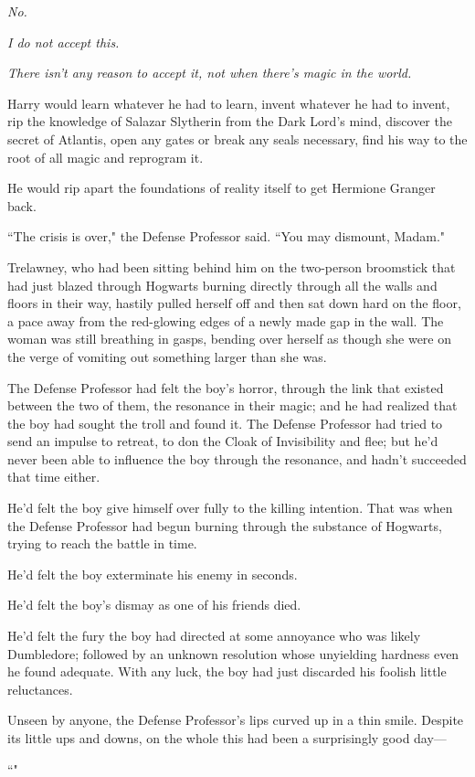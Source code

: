 \emph{No.}

\emph{I do not accept this.}

\emph{There isn't any reason to accept it, not when there's magic in the world.}

Harry would learn whatever he had to learn, invent whatever he had to invent, rip the knowledge of Salazar Slytherin from the Dark Lord's mind, discover the secret of Atlantis, open any gates or break any seals necessary, find his way to the root of all magic and reprogram it.

He would rip apart the foundations of reality itself to get Hermione Granger back.

\later

``The crisis is over," the Defense Professor said. ``You may dismount, Madam."

Trelawney, who had been sitting behind him on the two-person broomstick that had just blazed through Hogwarts burning directly through all the walls and floors in their way, hastily pulled herself off and then sat down hard on the floor, a pace away from the red-glowing edges of a newly made gap in the wall. The woman was still breathing in gasps, bending over herself as though she were on the verge of vomiting out something larger than she was.

The Defense Professor had felt the boy's horror, through the link that existed between the two of them, the resonance in their magic; and he had realized that the boy had sought the troll and found it. The Defense Professor had tried to send an impulse to retreat, to don the Cloak of Invisibility and flee; but he'd never been able to influence the boy through the resonance, and hadn't succeeded that time either.

He'd felt the boy give himself over fully to the killing intention. That was when the Defense Professor had begun burning through the substance of Hogwarts, trying to reach the battle in time.

He'd felt the boy exterminate his enemy in seconds.

He'd felt the boy's dismay as one of his friends died.

He'd felt the fury the boy had directed at some annoyance who was likely Dumbledore; followed by an unknown resolution whose unyielding hardness even he found adequate. With any luck, the boy had just discarded his foolish little reluctances.

Unseen by anyone, the Defense Professor's lips curved up in a thin smile. Despite its little ups and downs, on the whole this had been a surprisingly good day---

``"

